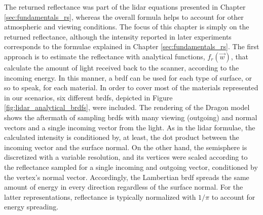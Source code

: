 The returned reflectance was part of the \acrshort{lidar} equations presented in Chapter \ref{sec:fundamentals_rs}, whereas the overall formula helps to account for other atmospheric and viewing conditions. The focus of this chapter is simply on the returned reflectance, although the intensity reported in later experiments corresponds to the formulae explained in Chapter \ref{sec:fundamentals_rs}. The first approach is to estimate the reflectance with analytical functions, $f_{r}(\vec{w})$, that calculate the amount of light received back to the scanner, according to the incoming energy. In this manner, a \acrshort{brdf} can be used for each type of surface, or so to speak, for each material. In order to cover most of the materials represented in our scenarios, six different \acrshort{brdf}s, depicted in Figure \ref{fig:lidar_analytical_brdfs}, were included. The rendering of the Dragon model shows the aftermath of sampling \acrshort{brdf}s with many viewing (outgoing) and normal vectors and a single incoming vector from the light. As in the \acrshort{lidar} formulae, the calculated intensity is conditioned by, at least, the dot product between the incoming vector and the surface normal. On the other hand, the semisphere is discretized with a variable resolution, and its vertices were scaled according to the reflectance sampled for a single incoming and outgoing vector, conditioned by the vertex's normal vector. Accordingly, the Lambertian \acrshort{brdf} spreads the same amount of energy in every direction regardless of the surface normal. For the latter representations, reflectance is typically normalized with $1/\pi$ to account for energy spreading.


